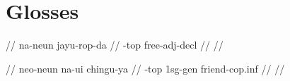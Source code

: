 \documentclass{article}
\begin{document}
\newpage\section{Glosses}

\ex
\begingl
\gla {}  //
\glb na-neun jayu-rop-da //
-{\sc top} free-{\sc adj}-{\sc decl} //
 //
\endgl
\xe

\ex
\begingl
\gla {}   //
\glb neo-neun na-ui chingu-ya //
-{\sc top} {\sc 1sg}-{\sc gen} friend-{\sc cop.inf} //
 //
\endgl
\xe
\end{document}
